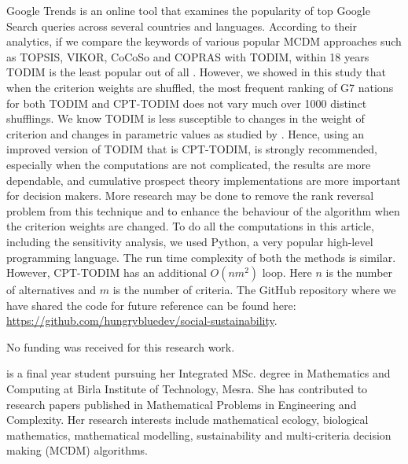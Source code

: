 \documentclass{infor}
\theoremstyle{remark}
\begin{document}
Google Trends is an online tool that examines the popularity of top Google Search queries across several countries and languages. According to their analytics, if we compare the keywords of various popular MCDM approaches such as TOPSIS, VIKOR, CoCoSo and COPRAS with TODIM, within 18 years TODIM is the least popular out of all \citep{GTrendsMCDMComp}. However, we showed in this study that when the criterion weights are shuffled, the most frequent ranking of G7 nations for both TODIM and CPT-TODIM does not vary much over 1000 distinct shufflings. We know TODIM is less susceptible to changes in the weight of criterion and changes in parametric values as studied by \cite{prabjot2021todim}. Hence, using an improved version of TODIM that is CPT-TODIM, is strongly recommended, especially when the computations are not complicated, the results are more dependable, and cumulative prospect theory implementations are more important for decision makers. More research may be done to remove the rank reversal problem from this technique and to enhance the behaviour of the algorithm when the criterion weights are changed. To do all the computations in this article, including the sensitivity analysis, we used Python, a very popular high-level programming language. The run time complexity of both the methods is similar. However, CPT-TODIM has an additional \(O(nm^2)\) loop. Here \(n\) is the number of alternatives and \(m\) is the number of criteria. The GitHub repository where we have shared the code for future reference can be found here: \href{https://github.com/hungrybluedev/social-sustainability}{https://github.com/hungrybluedev/social-sustainability}.


\begin{funding}
No funding was received for this research work.
\end{funding}



\vfill
\begin{biography}\label{bio1}
\author{V. Dutta} is a final year student pursuing her Integrated MSc. degree in Mathematics and Computing at Birla Institute of Technology, Mesra. She has contributed to research papers published in Mathematical Problems in Engineering and Complexity. Her research interests include mathematical ecology, biological mathematics, mathematical modelling, sustainability and multi-criteria decision making (MCDM) algorithms.
\end{biography}
\end{document}
